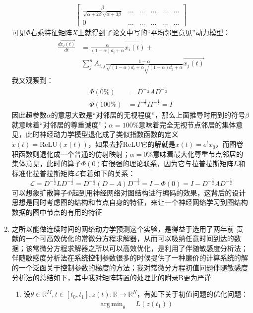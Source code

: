 \documentclass[11pt]{article}
\DeclareMathOperator*{\argmin}{arg\,min}
\begin{document}
\begin{enumerate}
\[\begin{split}
\begin{bmatrix}
\frac{\beta}{\sqrt{\alpha+2\beta}\sqrt{\alpha+3\beta}}&\dots&\dots&\dots&\dots&\dots\\
0&\dots&\dots&\dots&\dots&\dots
\end{bmatrix}
\end{split}
\]可见$\Phi$右乘特征矩阵$X$上就得到了论文中写的``平均邻里意见''动力模型：\[
\begin{split}
\frac{d\overrightarrow{x_i(t)}}{dt}&=\frac{\alpha}{(1-\alpha)d_i+\alpha}\overrightarrow{x_i(t)}+\\
&\sum_j^n A_{i,j}\frac{1-\alpha}{\sqrt{(1-\alpha)d_i+\alpha}\sqrt{(1-\alpha)d_j+\alpha}}\overrightarrow{x_j(t)}
\end{split}
\]我又观察到：\[
\begin{split}
\Phi(0\%)&=D^{-\frac{1}{2}}AD^{-\frac{1}{2}}\\
\Phi(100\%)&=I^{-\frac{1}{2}}II^{-\frac{1}{2}}=I
\end{split}
\]因此超参数$\alpha$的意思大致是``对邻居的无视程度''，那么上面推导时用到的符号$\beta$就意味着``对邻居的尊重诚度''；$\alpha=100\%$意味着完全无视节点邻居的集体意见，此时神经动力学模型退化成了类似指数函数的定义$\dot{x}(t)=\text{ReLU}(x(t))$，如果去掉ReLU它的解就是$x(t)=e^tx_0$，而图卷积函数则退化成一个普通的仿射映射；$\alpha=0\%$意味着最大化尊重节点邻居的集体意见，此时的算子$\Phi(0)$有很强的理论联系，因为它与拉普拉斯矩阵$L$和标准化拉普拉斯矩阵$\mathcal{L}$有着如下的关系：\[
\mathcal{L}=D^{-{\frac {1}{2}}}LD^{-{\frac {1}{2}}}=D^{-{\frac {1}{2}}}(D-A)D^{-{\frac {1}{2}}}=I-\Phi(0)=I-D^{-\frac{1}{2}}AD^{-\frac{1}{2}}
\]可以想象扩散算子$\Phi$起到用神经网络对图结构进行编码的效果，这背后的设计思想是同时考虑图的结构和节点自身的特征，来让一个神经网络学习到图结构数据的图中节点的有用的特征
\item \cite{zang2019neural} 之所以能做连续时间的网络动力学预测这个实验，是得益于选用了两年前 \cite{DBLP:journals/corr/abs-1806-07366} 贡献的一个可高效优化的常微分方程求解器，从而可以吸纳任意时间到达的数据；该常微分方程求解器之所以可以高效优化，是利用了伴随敏感度分析法；伴随敏感度分析法在系统控制参数很多的时候提供了一种廉价的计算系统的解的一个泛函关于控制参数的梯度的方法；我对常微分方程初值问题伴随敏感度分析法的总结如下，其中我对矩阵转置的处理比\cite{DBLP:journals/corr/abs-1806-07366}的附录B更为严谨
\begin{enumerate}
\item 设$\theta\in\mathbb{R}^M,t\in[t_0,t_1],z(t):\mathbb{R}\to\mathbb{R}^N$，有如下关于初值问题的优化问题：\[
\begin{split}
\argmin_{\theta}\text{ }&L(z(t_1))\\

\end{split}\]
\end{enumerate}
\end{enumerate}
\end{document}
